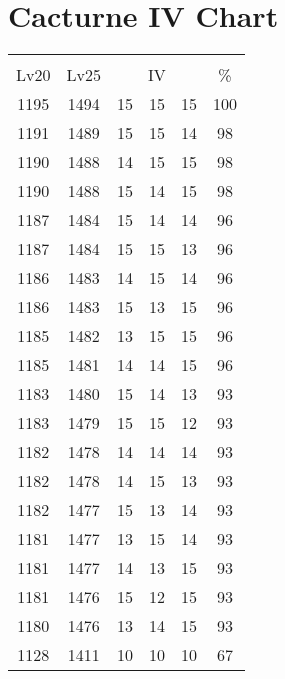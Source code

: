 \documentclass{article}%
\begin{document}
%
\normalsize%
\section{Cacturne IV Chart}%
\label{sec:Cacturne IV Chart}%
\renewcommand{\arraystretch}{1.5}%
\begin{tabular}{|c|c|c|c|c|c|}%
\hline%
\multicolumn{6}{|c|}{\textcolor{white}{ 
\linebreak{Cacturne}
}%
\cellcolor{black}}\\%
\multicolumn{1}{|c}{Lv20}&\multicolumn{1}{c|}{Lv25}&\multicolumn{3}{c|}{IV}&\multicolumn{1}{|c|}{\%}\\%
\hline%
\rowcolor{color100}%
1195&1494&15&15&15&100\\%
\hline%
\rowcolor{color98}%
1191&1489&15&15&14&98\\%
\hline%
\rowcolor{color98}%
1190&1488&14&15&15&98\\%
\hline%
\rowcolor{color98}%
1190&1488&15&14&15&98\\%
\hline%
\rowcolor{color96}%
1187&1484&15&14&14&96\\%
\hline%
\rowcolor{color96}%
1187&1484&15&15&13&96\\%
\hline%
\rowcolor{color96}%
1186&1483&14&15&14&96\\%
\hline%
\rowcolor{color96}%
1186&1483&15&13&15&96\\%
\hline%
\rowcolor{color96}%
1185&1482&13&15&15&96\\%
\hline%
\rowcolor{color96}%
1185&1481&14&14&15&96\\%
\hline%
\rowcolor{color93}%
1183&1480&15&14&13&93\\%
\hline%
\rowcolor{color93}%
1183&1479&15&15&12&93\\%
\hline%
\rowcolor{color93}%
1182&1478&14&14&14&93\\%
\hline%
\rowcolor{color93}%
1182&1478&14&15&13&93\\%
\hline%
\rowcolor{color93}%
1182&1477&15&13&14&93\\%
\hline%
\rowcolor{color93}%
1181&1477&13&15&14&93\\%
\hline%
\rowcolor{color93}%
1181&1477&14&13&15&93\\%
\hline%
\rowcolor{color93}%
1181&1476&15&12&15&93\\%
\hline%
\rowcolor{color93}%
1180&1476&13&14&15&93\\%
\hline%
\rowcolor{color91}%
1128&1411&10&10&10&67\\%
\end{tabular}

%
\end{document}
